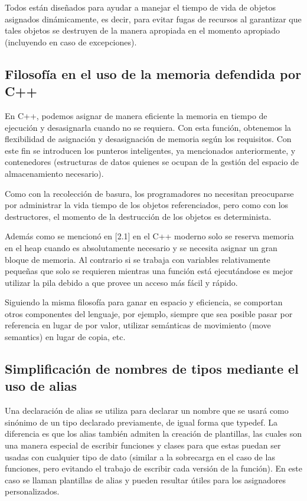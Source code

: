 \documentclass[10pt]{article}
\begin{document}
Todos están diseñados para ayudar a manejar el tiempo de vida de objetos asignados dinámicamente, es decir, para evitar fugas de recursos al garantizar que tales objetos se destruyen de la manera apropiada en el momento apropiado (incluyendo en caso de excepciones).

\subsection{Filosofía en el uso de la memoria defendida por C++}

En C++, podemos asignar de manera eficiente la memoria en tiempo de ejecución y desasignarla cuando no se requiera. Con esta función, obtenemos la flexibilidad de asignación y desasignación de memoria según los requisitos. Con este fin se introducen los punteros inteligentes, ya mencionados anteriormente, y contenedores (estructuras de datos quienes se ocupan de la gestión del espacio de almacenamiento necesario).

Como con la recolección de basura, los programadores no necesitan preocuparse por administrar la vida tiempo de los objetos referenciados, pero como con los destructores, el momento de la destrucción de los objetos es determinista.

Adem\'as como se mencion\'o en [2.1] en el C++ moderno solo se reserva memoria en el heap cuando es absolutamente necesario y se necesita asignar un gran bloque de memoria. Al contrario si se trabaja con variables relativamente pequeñas que solo se requieren mientras una función está ejecut\'andose es mejor utilizar la pila debido a que provee un acceso más fácil y rápido. 

Siguiendo la misma filosof\'ia para ganar en espacio y eficiencia, se comportan otros componentes del lenguaje, por ejemplo, siempre que sea posible pasar por referencia en lugar de por valor, utilizar semánticas de movimiento (move semantics) en lugar de copia, etc.


\subsection{Simplificaci\'on de nombres de tipos mediante el uso de alias}

Una declaración de alias se utiliza para declarar un nombre que se usará como sinónimo de un tipo declarado previamente, de igual forma que typedef. La diferencia es que los alias tambi\'en admiten la creaci\'on de plantillas, las cuales son una manera especial de escribir funciones y clases para que estas puedan ser usadas con cualquier tipo de dato (similar a la sobrecarga en el caso de las funciones, pero evitando el trabajo de escribir cada versión de la función). En este caso se llaman plantillas de alias y pueden resultar útiles para los asignadores personalizados.
\end{document}
